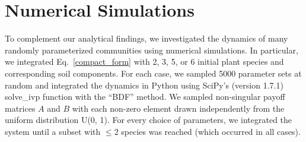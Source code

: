 \documentclass[11pt]{article}
\begin{document}
\section{Numerical Simulations}
To complement our analytical findings, we investigated the dynamics of many randomly parameterized communities using numerical simulations. In particular, we integrated  Eq.~\ref{compact_form} with 2, 3, 5, or 6 initial plant species and corresponding soil components. For each case, we sampled 5000 parameter sets at random and integrated the dynamics in Python using SciPy's (version 1.7.1) solve\_ivp function with the ``BDF'' method. We sampled non-singular payoff matrices $ A $ and $ B $ with each non-zero element drawn independently from the uniform distribution U(0, 1). For every choice of parameters, we integrated the system until a subset with $\leq 2$ species was reached (which occurred in all cases).



\end{document}
